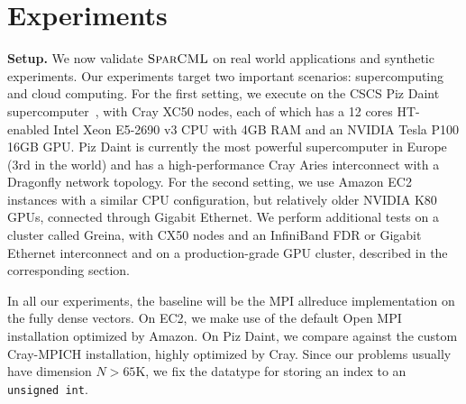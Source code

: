 \documentclass[11pt]{article}
\renewcommand{\paragraph}[1]{\vspace{0.1em} \noindent \textbf{#1}}
\newcommand{\mml}{$\textsc{SparCML}$}
\begin{document}
\section{Experiments}


\paragraph{Setup.} 
We now validate \mml{} on real world applications and synthetic
experiments.
Our experiments target two important scenarios:
supercomputing and cloud computing.  For the first setting, we execute
on the CSCS Piz Daint supercomputer~\cite{PizDaint}, with Cray XC50
nodes, each of which has a 12 cores HT-enabled Intel Xeon E5-2690 v3 CPU
with 4GB RAM and an NVIDIA Tesla P100 16GB GPU. Piz Daint is currently
the most powerful supercomputer in Europe (3rd in the world) and has a
high-performance Cray Aries interconnect with a Dragonfly network topology.
For the second setting, we use Amazon EC2 instances with a similar CPU
configuration, but relatively older NVIDIA K80 GPUs, connected
through Gigabit Ethernet.  We perform additional tests on a
cluster called Greina, with CX50 nodes and an InfiniBand FDR or 
Gigabit Ethernet interconnect and on a production-grade GPU cluster, described in the corresponding section.  


In all our experiments, the baseline will be the MPI allreduce implementation on the fully dense vectors. 
On EC2, we make use of the default Open MPI installation optimized by Amazon. 
On Piz Daint, we compare against the custom Cray-MPICH installation, highly optimized by Cray. Since our problems usually have dimension $N > 65 \textrm{K}$,  
we fix the datatype for storing an index to an \verb!unsigned int!.
\end{document}
